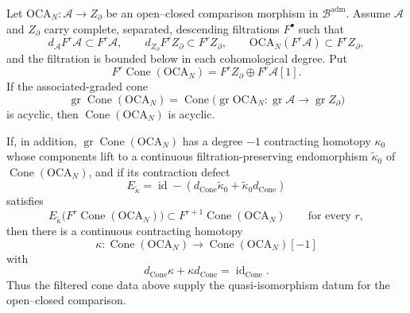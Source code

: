 \begin{thm}
\label{thm:filtered-oca-cone-criterion}
Let \(\mathrm{OCA}_N\colon\mathcal A\to Z_\partial\) be an
open--closed comparison morphism in \(\mathcal B^{\mathrm{adm}}\).
Assume \(\mathcal A\) and \(Z_\partial\) carry complete, separated,
descending filtrations \(F^\bullet\) such that
\[
  d_{\mathcal A}F^r\mathcal A\subset F^r\mathcal A,\qquad
  d_{Z_\partial}F^rZ_\partial\subset F^rZ_\partial,\qquad
  \mathrm{OCA}_N(F^r\mathcal A)\subset F^rZ_\partial ,
\]
and the filtration is bounded below in each cohomological degree.  Put
\[
  F^r\operatorname{Cone}(\mathrm{OCA}_N)
  =
  F^rZ_\partial\oplus F^r\mathcal A[1].
\]
If the associated-graded cone
\[
  \operatorname{gr}\operatorname{Cone}(\mathrm{OCA}_N)
  =
  \operatorname{Cone}\bigl(
    \operatorname{gr}\mathrm{OCA}_N\colon
    \operatorname{gr}\mathcal A\to\operatorname{gr}Z_\partial\bigr)
\]
is acyclic, then \(\operatorname{Cone}(\mathrm{OCA}_N)\) is acyclic.

If, in addition, \(\operatorname{gr}\operatorname{Cone}(\mathrm{OCA}_N)\)
has a degree \(-1\) contracting homotopy \(\kappa_0\) whose components
lift to a continuous filtration-preserving endomorphism
\(\widetilde\kappa_0\) of
\(\operatorname{Cone}(\mathrm{OCA}_N)\), and if its contraction defect
\[
  E_{\widetilde\kappa}
  =
  \operatorname{id}-
  (d_{\operatorname{Cone}}\widetilde\kappa_0
   +\widetilde\kappa_0d_{\operatorname{Cone}})
\]
satisfies
\[
  E_{\widetilde\kappa}
  \bigl(F^r\operatorname{Cone}(\mathrm{OCA}_N)\bigr)
  \subset
  F^{r+1}\operatorname{Cone}(\mathrm{OCA}_N)
  \qquad\text{for every }r,
\]
then there is a continuous contracting homotopy
\[
  \kappa\colon
  \operatorname{Cone}(\mathrm{OCA}_N)
  \longrightarrow
  \operatorname{Cone}(\mathrm{OCA}_N)[-1]
  \]
with
\[
  d_{\operatorname{Cone}}\kappa+\kappa d_{\operatorname{Cone}}
  =\operatorname{id}_{\operatorname{Cone}} .
\]
Thus the filtered cone data above supply the quasi-isomorphism datum for
the open--closed comparison.
\end{thm}

